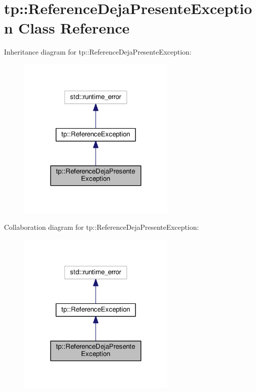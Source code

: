 \hypertarget{classtp_1_1ReferenceDejaPresenteException}{}\section{tp\+:\+:Reference\+Deja\+Presente\+Exception Class Reference}
\label{classtp_1_1ReferenceDejaPresenteException}


Inheritance diagram for tp\+:\+:Reference\+Deja\+Presente\+Exception\+:\nopagebreak
\begin{figure}[H]
\begin{center}
\leavevmode
\includegraphics[width=215pt]{classtp_1_1ReferenceDejaPresenteException__inherit__graph}
\end{center}
\end{figure}


Collaboration diagram for tp\+:\+:Reference\+Deja\+Presente\+Exception\+:\nopagebreak
\begin{figure}[H]
\begin{center}
\leavevmode
\includegraphics[width=215pt]{classtp_1_1ReferenceDejaPresenteException__coll__graph}
\end{center}
\end{figure}
